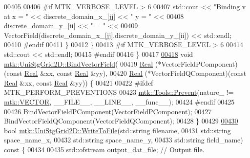 \begin{DoxyCode}
00405 
00406 \textcolor{preprocessor}{      #if MTK\_VERBOSE\_LEVEL > 6}
00407       std::cout << \textcolor{stringliteral}{"Binding v at x = "} << discrete\_domain\_x\_[jj] << \textcolor{stringliteral}{" y = "} <<
00408         discrete\_domain\_y\_[ii] << \textcolor{stringliteral}{" = "} <<
00409         VectorField(discrete\_domain\_x\_[jj],discrete\_domain\_y\_[ii]) << std::endl;
00410 \textcolor{preprocessor}{      #endif}
00411     \}
00412   \}
00413 \textcolor{preprocessor}{  #if MTK\_VERBOSE\_LEVEL > 6}
00414   std::cout << std::endl;
00415 \textcolor{preprocessor}{  #endif}
00416 \}
00417 
\hypertarget{mtk__uni__stg__grid__2d_8cc_source_l00418}{}\hyperlink{classmtk_1_1UniStgGrid2D_ae274b24672e9bd6075bf38b015bd9083}{00418} \textcolor{keywordtype}{void} \hyperlink{classmtk_1_1UniStgGrid2D_ae274b24672e9bd6075bf38b015bd9083}{mtk::UniStgGrid2D::BindVectorField}(
00419   \hyperlink{group__c01-roots_gac080bbbf5cbb5502c9f00405f894857d}{Real} (*VectorFieldPComponent)(\textcolor{keyword}{const} \hyperlink{group__c01-roots_gac080bbbf5cbb5502c9f00405f894857d}{Real} &xx, \textcolor{keyword}{const} \hyperlink{group__c01-roots_gac080bbbf5cbb5502c9f00405f894857d}{Real} &yy),
00420   \hyperlink{group__c01-roots_gac080bbbf5cbb5502c9f00405f894857d}{Real} (*VectorFieldQComponent)(\textcolor{keyword}{const} \hyperlink{group__c01-roots_gac080bbbf5cbb5502c9f00405f894857d}{Real} &xx, \textcolor{keyword}{const} \hyperlink{group__c01-roots_gac080bbbf5cbb5502c9f00405f894857d}{Real} &yy)) \{
00421 
00422 \textcolor{preprocessor}{  #ifdef MTK\_PERFORM\_PREVENTIONS}
00423   \hyperlink{classmtk_1_1Tools_a332324c6f25e66be9dff48c5987a3b9f}{mtk::Tools::Prevent}(nature\_ != \hyperlink{namespacemtk_ga4c54f2a329cfb4e56213b02a259d19e2a3d8cb27a993651a74d67fb8c98ae91b2}{mtk::VECTOR}, \_\_FILE\_\_, \_\_LINE\_\_, \_\_func\_\_);
00424 \textcolor{preprocessor}{  #endif}
00425 
00426   BindVectorFieldPComponent(VectorFieldPComponent);
00427   BindVectorFieldQComponent(VectorFieldQComponent);
00428 \}
00429 
\hypertarget{mtk__uni__stg__grid__2d_8cc_source_l00430}{}\hyperlink{classmtk_1_1UniStgGrid2D_a1787a79e4bcee6b89c681dc7e5e2d7bc}{00430} \textcolor{keywordtype}{bool} \hyperlink{classmtk_1_1UniStgGrid2D_a1787a79e4bcee6b89c681dc7e5e2d7bc}{mtk::UniStgGrid2D::WriteToFile}(std::string filename,
00431                                     std::string space\_name\_x,
00432                                     std::string space\_name\_y,
00433                                     std::string field\_name)\textcolor{keyword}{ const }\{
00434 
00435   std::ofstream output\_dat\_file;  \textcolor{comment}{// Output file.}

\end{DoxyCode}
